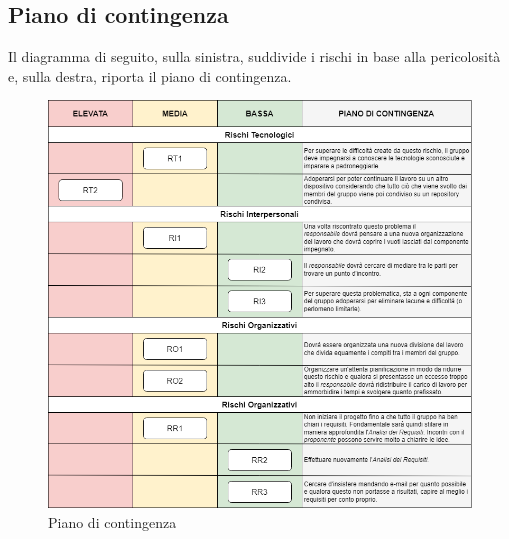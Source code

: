 \subsection{Piano di contingenza} \label{subsection:piano_contingenza}
Il diagramma di seguito, sulla sinistra, suddivide i rischi in base alla pericolosità e, sulla destra, riporta il
piano di contingenza.
\begin{figure}[H]
	\centering
  \includegraphics[scale=0.6]{immagini/piano_di_contingenza.png}
  \caption{Piano di contingenza}
\end{figure}